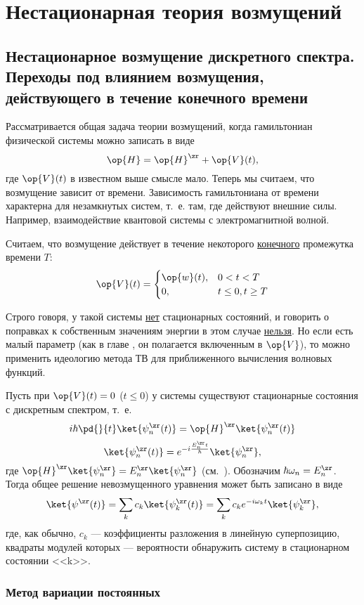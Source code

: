 \chapter{Нестационарная теория возмущений}

\section{Нестационарное возмущение дискретного спектра. Переходы под влиянием возмущения, действующего в течение конечного времени}

Рассматривается общая задача теории возмущений, когда гамильтониан физической системы можно записать в виде
$$
\op{H} = \op{H}^\zr + \op{V}(t),
$$
где $\op{V}(t)$ в известном выше смысле мало. Теперь мы считаем, что возмущение зависит от времени. Зависимость гамильтониана от времени характерна для незамкнутых систем, т.~е. там, где действуют внешние силы. Например, взаимодействие квантовой системы с электромагнитной волной.

Считаем, что возмущение действует в течение некоторого \underline{конечного} промежутка времени $T$:
$$
\op{V}(t) = 
  \begin{cases}
    \op{w}(t), &  0 < t < T \\
    0, & t \le 0, t \ge T
  \end{cases}
$$

Строго говоря, у такой системы \underline{нет} стационарных состояний, и говорить о поправках к собственным значениям энергии в этом случае \underline{нельзя}. Но если есть малый параметр (как в главе , он полагается включенным в $\op{V}$), то можно применить идеологию метода ТВ для приближенного вычисления волновых функций.

Пусть при $\op{V}(t) = 0$ ($t \le 0$) у системы существуют стационарные состояния с дискретным спектром, т.~е.
$$
i \hbar \pd{}{t} \ket{\psi_n^\zr(t)} = \op{H}^\zr \ket{\psi_n^\zr(t)} 
$$
$$
\ket{\psi_n^\zr (t)} = e^{-i \frac{E_n^\zr t}{\hbar}} \ket{\psi_n^\zr},
$$
где $\op{H}^\zr \ket{\psi_n^\zr} = E_n^\zr \ket{\psi_n^\zr}$ (см.~). Обозначим $\hbar \omega_n = E_n^\zr$. Тогда общее решение невозмущенного уравнения может быть записано в виде
$$
\ket{\psi^\zr(t)} = \sum_k c_k \ket{\psi_k^\zr (t)} = \sum_k c_k e^{-i \omega_k t} \ket{\psi_k^\zr},
$$
где, как обычно, $c_k$ --- коэффициенты разложения в линейную суперпозицию, квадраты модулей которых --- вероятности обнаружить систему в стационарном состоянии <<k>>.

\subsection{Метод вариации постоянных}

